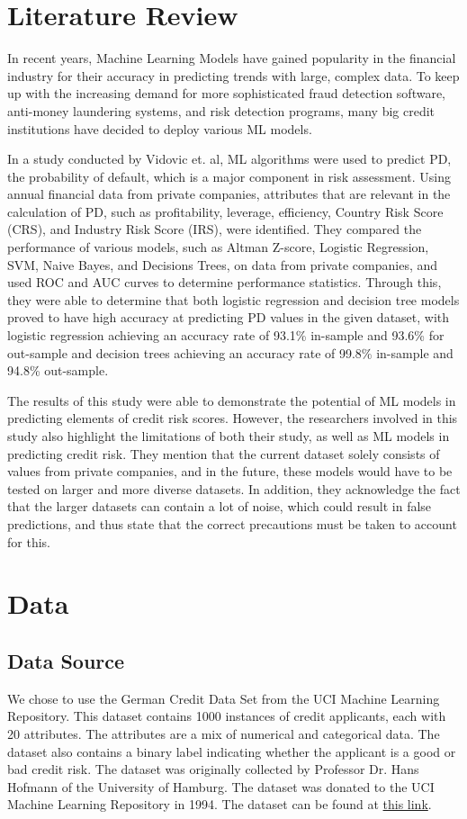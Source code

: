 \documentclass[12pt,twocolumn]{article}
\begin{document}
\section{Literature Review}
In recent years, Machine Learning Models have gained popularity in the financial industry for their accuracy in predicting trends with large, complex data. To keep up with the increasing demand for more sophisticated fraud detection software, anti-money laundering systems, and risk detection programs, many big credit institutions have decided to deploy various ML models. 

In a study conducted by Vidovic et. al, ML algorithms were used to predict PD, the probability of default, which is a major component in risk assessment. Using annual financial data from private companies, attributes that are relevant in the calculation of PD, such as profitability, leverage, efficiency, Country Risk Score (CRS), and Industry Risk Score (IRS), were identified. They compared the performance of various models, such as Altman Z-score, Logistic Regression, SVM, Naive Bayes, and Decisions Trees, on data from private companies, and used ROC and AUC curves to determine performance statistics. Through this, they were able to determine that both logistic regression and decision tree models proved to have high accuracy at predicting PD values in the given dataset, with logistic regression achieving an accuracy rate of 93.1\% in-sample and 93.6\% for out-sample and decision trees achieving an accuracy rate of 99.8\% in-sample and 94.8\% out-sample. 

The results of this study were able to demonstrate the potential of ML models in predicting elements of credit risk scores. However, the researchers involved in this study also highlight the limitations of both their study, as well as ML models in predicting credit risk. They mention that the current dataset solely consists of values from private companies, and in the future, these models would have to be tested on larger and more diverse datasets. In addition, they acknowledge the fact that the larger datasets can contain a lot of noise, which could result in false predictions, and thus state that the correct precautions must be taken to account for this. 



\section{Data}
\subsection{Data Source}
We chose to use the German Credit Data Set from the UCI Machine Learning Repository. This dataset contains 1000 instances of credit applicants, each with 20 attributes. The attributes are a mix of numerical and categorical data. The dataset also contains a binary label indicating whether the applicant is a good or bad credit risk. The dataset was originally collected by Professor Dr. Hans Hofmann of the University of Hamburg. The dataset was donated to the UCI Machine Learning Repository in 1994. The dataset can be found at \href{https://archive.ics.uci.edu/ml/datasets/statlog+(german+credit+data)}{this link}.
\end{document}
